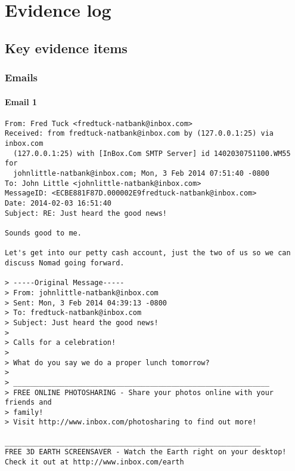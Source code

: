 \section{Evidence log}
\subsection{Key evidence items}
\subsubsection{Emails}
\paragraph{Email 1}
\label{MailNomad1}
\begin{verbatim}
From: Fred Tuck <fredtuck-natbank@inbox.com>
Received: from fredtuck-natbank@inbox.com by (127.0.0.1:25) via inbox.com
  (127.0.0.1:25) with [InBox.Com SMTP Server] id 1402030751100.WM55 for
  johnlittle-natbank@inbox.com; Mon, 3 Feb 2014 07:51:40 -0800
To: John Little <johnlittle-natbank@inbox.com>
MessageID: <ECBE881F87D.000002E9fredtuck-natbank@inbox.com>
Date: 2014-02-03 16:51:40
Subject: RE: Just heard the good news!

Sounds good to me.

Let's get into our petty cash account, just the two of us so we can discuss Nomad going forward.

> -----Original Message-----
> From: johnlittle-natbank@inbox.com
> Sent: Mon, 3 Feb 2014 04:39:13 -0800
> To: fredtuck-natbank@inbox.com
> Subject: Just heard the good news!
> 
> Calls for a celebration!
> 
> What do you say we do a proper lunch tomorrow?
> 
> ____________________________________________________________
> FREE ONLINE PHOTOSHARING - Share your photos online with your friends and
> family!
> Visit http://www.inbox.com/photosharing to find out more!

____________________________________________________________
FREE 3D EARTH SCREENSAVER - Watch the Earth right on your desktop!
Check it out at http://www.inbox.com/earth


\end{verbatim}

